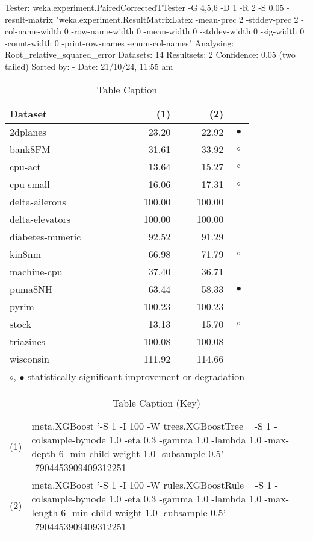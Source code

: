 Tester:     weka.experiment.PairedCorrectedTTester -G 4,5,6 -D 1 -R 2 -S 0.05 -result-matrix "weka.experiment.ResultMatrixLatex -mean-prec 2 -stddev-prec 2 -col-name-width 0 -row-name-width 0 -mean-width 0 -stddev-width 0 -sig-width 0 -count-width 0 -print-row-names -enum-col-names"
Analysing:  Root_relative_squared_error
Datasets:   14
Resultsets: 2
Confidence: 0.05 (two tailed)
Sorted by:  -
Date:       21/10/24, 11:55 am


\begin{table}[thb]
\caption{\label{labelname}Table Caption}
\footnotesize
{\centering \begin{tabular}{lrr@{\hspace{0.1cm}}c}
\\
\hline
Dataset & (1)& (2) & \\
\hline
2dplanes &  23.20 &  22.92 & $\bullet$\\
bank8FM &  31.61 &  33.92 &   $\circ$\\
cpu-act &  13.64 &  15.27 &   $\circ$\\
cpu-small &  16.06 &  17.31 &   $\circ$\\
delta-ailerons & 100.00 & 100.00 &          \\
delta-elevators & 100.00 & 100.00 &          \\
diabetes-numeric &  92.52 &  91.29 &          \\
kin8nm &  66.98 &  71.79 &   $\circ$\\
machine-cpu &  37.40 &  36.71 &          \\
puma8NH &  63.44 &  58.33 & $\bullet$\\
pyrim & 100.23 & 100.23 &          \\
stock &  13.13 &  15.70 &   $\circ$\\
triazines & 100.08 & 100.08 &          \\
wisconsin & 111.92 & 114.66 &          \\
\hline
\multicolumn{4}{c}{$\circ$, $\bullet$ statistically significant improvement or degradation}\\
\end{tabular} \footnotesize \par}
\end{table}


\begin{table}[thb]
\caption{\label{labelname}Table Caption (Key)}
\scriptsize
{\centering
\begin{tabular}{cl}\\
(1) & meta.XGBoost '-S 1 -I 100 -W trees.XGBoostTree -- -S 1 -colsample-bynode 1.0 -eta 0.3 -gamma 1.0 -lambda 1.0 -max-depth 6 -min-child-weight 1.0 -subsample 0.5' -7904453909409312251 \\
(2) & meta.XGBoost '-S 1 -I 100 -W rules.XGBoostRule -- -S 1 -colsample-bynode 1.0 -eta 0.3 -gamma 1.0 -lambda 1.0 -max-length 6 -min-child-weight 1.0 -subsample 0.5' -7904453909409312251 \\
\end{tabular}
}
\end{table}


